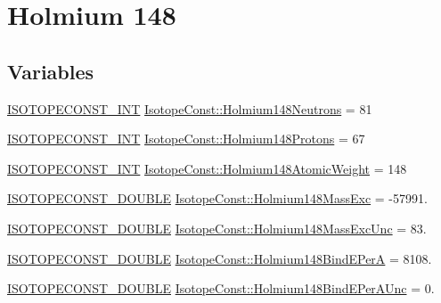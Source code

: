 \hypertarget{group___isotope_const-_holmium-_ho148}{}\section{Holmium 148}
\label{group___isotope_const-_holmium-_ho148}
\subsection*{Variables}
\begin{DoxyCompactItemize}
\item 
\mbox{\hyperlink{group___isotope_const-_macros_ga5f18360b3e99483a35c32d789e62621c}{I\+S\+O\+T\+O\+P\+E\+C\+O\+N\+S\+T\+\_\+\+I\+NT}} \mbox{\hyperlink{group___isotope_const-_holmium-_ho148_ga480c9c991b4420bebe08f81dcda26c82}{Isotope\+Const\+::\+Holmium148\+Neutrons}} = 81
\item 
\mbox{\hyperlink{group___isotope_const-_macros_ga5f18360b3e99483a35c32d789e62621c}{I\+S\+O\+T\+O\+P\+E\+C\+O\+N\+S\+T\+\_\+\+I\+NT}} \mbox{\hyperlink{group___isotope_const-_holmium-_ho148_ga6c8b89f512480fbd06b2ae04ac3cf912}{Isotope\+Const\+::\+Holmium148\+Protons}} = 67
\item 
\mbox{\hyperlink{group___isotope_const-_macros_ga5f18360b3e99483a35c32d789e62621c}{I\+S\+O\+T\+O\+P\+E\+C\+O\+N\+S\+T\+\_\+\+I\+NT}} \mbox{\hyperlink{group___isotope_const-_holmium-_ho148_ga64971178b53f6d4a724e5cf0f8ddbdcd}{Isotope\+Const\+::\+Holmium148\+Atomic\+Weight}} = 148
\item 
\mbox{\hyperlink{group___isotope_const-_macros_ga8f45a7272ce02c0b4c65c44636ed719a}{I\+S\+O\+T\+O\+P\+E\+C\+O\+N\+S\+T\+\_\+\+D\+O\+U\+B\+LE}} \mbox{\hyperlink{group___isotope_const-_holmium-_ho148_ga5bd053195b232d7478e85d92e4d169d9}{Isotope\+Const\+::\+Holmium148\+Mass\+Exc}} = -\/57991.
\item 
\mbox{\hyperlink{group___isotope_const-_macros_ga8f45a7272ce02c0b4c65c44636ed719a}{I\+S\+O\+T\+O\+P\+E\+C\+O\+N\+S\+T\+\_\+\+D\+O\+U\+B\+LE}} \mbox{\hyperlink{group___isotope_const-_holmium-_ho148_gaa727b2058f7799d6ca73425f1622f0e2}{Isotope\+Const\+::\+Holmium148\+Mass\+Exc\+Unc}} = 83.
\item 
\mbox{\hyperlink{group___isotope_const-_macros_ga8f45a7272ce02c0b4c65c44636ed719a}{I\+S\+O\+T\+O\+P\+E\+C\+O\+N\+S\+T\+\_\+\+D\+O\+U\+B\+LE}} \mbox{\hyperlink{group___isotope_const-_holmium-_ho148_gac4088806ee669b7f5dd4f450f3ebb504}{Isotope\+Const\+::\+Holmium148\+Bind\+E\+PerA}} = 8108.
\item 
\mbox{\hyperlink{group___isotope_const-_macros_ga8f45a7272ce02c0b4c65c44636ed719a}{I\+S\+O\+T\+O\+P\+E\+C\+O\+N\+S\+T\+\_\+\+D\+O\+U\+B\+LE}} \mbox{\hyperlink{group___isotope_const-_holmium-_ho148_ga84ea0030a912ff551640ecc1c3e9bda0}{Isotope\+Const\+::\+Holmium148\+Bind\+E\+Per\+A\+Unc}} = 0.

\end{DoxyCompactItemize}
